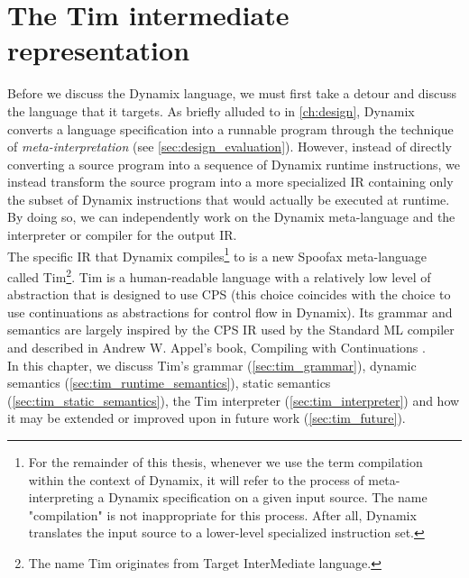 
\chapter{\label{ch:tim}The Tim intermediate representation}

Before we discuss the Dynamix language, we must first take a detour and discuss the language that it targets. As briefly alluded to in \cref{ch:design}, Dynamix converts a language specification into a runnable program through the technique of \textit{meta-interpretation} (see \cref{sec:design_evaluation}). However, instead of directly converting a source program into a sequence of Dynamix runtime instructions, we instead transform the source program into a more specialized \acf{IR} containing only the subset of Dynamix instructions that would actually be executed at runtime. By doing so, we can independently work on the Dynamix meta-language and the interpreter or compiler for the output \ac{IR}.\\

The specific \ac{IR} that Dynamix compiles\footnote{For the remainder of this thesis, whenever we use the term compilation within the context of Dynamix, it will refer to the process of meta-interpreting a Dynamix specification on a given input source. The name "compilation" is not inappropriate for this process. After all, Dynamix translates the input source to a lower-level specialized instruction set.} to is a new Spoofax meta-language called Tim\footnote{The name Tim originates from Target InterMediate language.}. Tim is a human-readable language with a relatively low level of abstraction that is designed to use \acf{CPS} (this choice coincides with the choice to use continuations as abstractions for control flow in Dynamix). Its grammar and semantics are largely inspired by the \ac{CPS} \ac{IR} used by the Standard ML compiler and described in Andrew W. Appel's book, Compiling with Continuations \cite{Appel1992}.\\

In this chapter, we discuss Tim's grammar (\cref{sec:tim_grammar}), dynamic semantics (\cref{sec:tim_runtime_semantics}), static semantics (\cref{sec:tim_static_semantics}), the Tim interpreter (\cref{sec:tim_interpreter}) and how it may be extended or improved upon in future work (\cref{sec:tim_future}).


